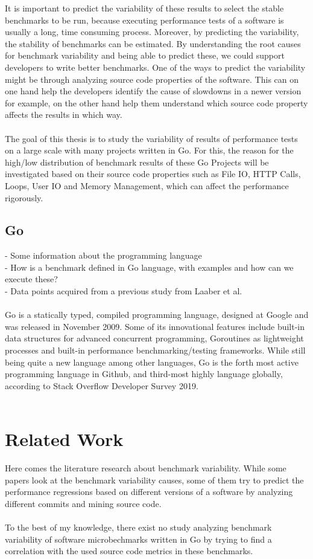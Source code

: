 \documentclass{seal_thesis}
\begin{document}
It is important to predict the variability of these results to select the stable benchmarks to be run, because executing performance tests of a software is usually a long, time consuming process. Moreover, by predicting the variability, the stability of benchmarks can be estimated. By understanding the root causes for benchmark variability and being able to predict these, we could support developers to write better benchmarks. One of the ways to predict the variability might be through analyzing source code properties of the software. This can on one hand help the developers identify the cause of slowdowns in a newer version for example, on the other hand help them understand which source code property affects the
results in which way.\\
\\
The goal of this thesis is to study the variability of results of performance tests on a large scale with many projects written in Go. For this, the reason for the high/low distribution of benchmark results of these Go Projects will be investigated based on their source code properties such as File IO, HTTP Calls, Loops, User IO and Memory Management, which can affect the performance rigorously.


\section{Go}
- Some information about the programming language \\
- How is a benchmark defined in Go language, with examples and how can we execute these? \\
- Data points acquired from a previous study from Laaber et al. \\
\\
Go is a statically typed, compiled programming language, designed at Google and was released in November 2009. Some of its innovational features include built-in data structures for advanced concurrent programming, Goroutines as lightweight processes and built-in performance benchmarking/testing frameworks. While still being quite a new language among other languages, Go is the forth most active programming language in Github, and third-most highly language globally, according to Stack Overflow Developer Survey 2019.\\
\\



\chapter{Related Work}
Here comes the literature research about benchmark variability. While some papers look at the benchmark variability causes, some of them try to predict the performance regressions based on different versions of a software by analyzing different commits and mining source code. \\
\\
To the best of my knowledge, there exist no study analyzing benchmark variability of software microbechmarks written in Go by trying to find a correlation with the used source code metrics in these benchmarks.
\end{document}
